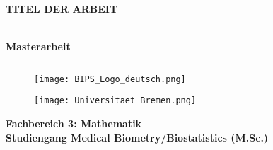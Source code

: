 \documentclass[12pt, a4paper]{report}\usepackage[]{graphicx}\usepackage[]{color}
\begin{document}
\thispagestyle{empty}

\begin{center}
\textbf{\LARGE{TITEL DER ARBEIT\\}} 
\end{center}

\begin{center}
\textbf{\Large{\\Masterarbeit}}
\end{center}
\begin{verbatim}

\end{verbatim}


\begin{figure}[htbp]
 \begin{minipage}{0.4\linewidth}
  \centering
  \texttt{[image: BIPS\_Logo\_deutsch.png]}
 \end{minipage}%
 \begin{minipage}{0.5\linewidth}
  \centering
  \texttt{[image: Universitaet\_Bremen.png]}
 \end{minipage}
\end{figure} 


\begin{comment}
\begin{subfigure}[htbp]
\begin{center}
\setkeys{Gin}{width=0.2\textwidth}
\texttt{[image: BIPS\_Logo\_deutsch.png]}
\end{center}
\end{subfigure}


\begin{subfigure}[htbp]
\begin{center}
\setkeys{Gin}{width=0.5\textwidth}
\texttt{[image: Universitaet\_Bremen.png]}
\end{center}
\end{subfigure}
\end{comment}
\begin{center}
\textbf{Fachbereich 3: Mathematik \\
Studiengang Medical Biometry/Biostatistics (M.Sc.)\\}
\end{center}
\begin{verbatim}

\end{verbatim}
\end{document}
